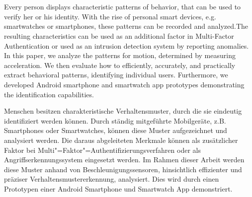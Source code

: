 \chapter{\abstractname}
Every person displays characteristic patterns of behavior, that can be used to verify her or his identity. With the rise of personal smart devices, e.g. smartwatches or smartphones, these patterns can be recorded and analyzed.The resulting characteristics can be used as an additional factor in Multi-Factor Authentication or used as an intrusion detection system by reporting anomalies.
In this paper, we analyze the patterns for motion, determined by measuring acceleration. We then evaluate how to efficiently, accurately, and practically extract behavioral patterns, identifying individual users. Furthermore, we developed Android smartphone and smartwatch app prototypes demonstrating the identification capabilities.

\vspace{3cm}
Menschen besitzen charakteristische Verhaltensmuster, durch die sie eindeutig identifiziert werden können. Durch ständig mitgeführte Mobilgeräte, z.B. Smartphones oder Smartwatches, können diese Muster aufgezeichnet und analysiert werden. Die daraus abgeleiteten Merkmale können als zusätzlicher Faktor bei Multi"=Faktor"=Authentifizierungsverfahren oder als Angriffserkennungssystem eingesetzt werden.
Im Rahmen dieser Arbeit werden diese Muster anhand von Beschleunigungssensoren, hinsichtlich effizienter und präziser Verhaltensmustererkennung, analysiert. Dies wird durch einen Prototypen einer Android Smartphone und Smartwatch App demonstriert.
